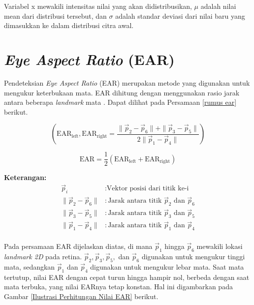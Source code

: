     
    Variabel x mewakili intensitas nilai yang akan didistribusikan, $\mu$ adalah nilai mean dari distribusi tersebut, dan $\sigma$ adalah standar deviasi dari nilai baru yang dimasukkan ke dalam distribusi citra awal.



\section{\textit{Eye Aspect Ratio} (EAR)}

    Pendeteksian \textit{Eye Aspect Ratio }(EAR) merupakan metode yang digunakan untuk mengukur keterbukaan mata. EAR dihitung dengan menggunakan rasio jarak antara beberapa \textit{landmark} mata \cite{electronics11193183}. Dapat dilihat pada Persamaan \ref{rumus ear} berikut.

    
    \begin{equation}
    \label{rumus ear}
    (\text{EAR}_{\text{left}}, \text{EAR}_{\text{right}}   = \frac{{\| \vec{p}_2 - \vec{p}_6 \| + \| \vec{p}_3 - \vec{p}_5 \|}}{{2 \| \vec{p}_1 - \vec{p}_4 \|}})
    \end{equation}

    \begin{equation}
    \text{EAR} = \frac{1}{2}(\text{EAR}_{\text{left}} + \text{EAR}_{\text{right}})
    \end{equation}


    \textbf{Keterangan:}
    \begin{align*}
        \vec{p}_i & : \text{Vektor posisi dari titik ke-i} \\
        \|\vec{p}_2 - \vec{p}_6\| & : \text{Jarak antara titik } \vec{p}_2 \text{ dan } \vec{p}_6 \\
        \|\vec{p}_3 - \vec{p}_5\| & : \text{Jarak antara titik } \vec{p}_3 \text{ dan } \vec{p}_5 \\
        \|\vec{p}_1 - \vec{p}_4\| & : \text{Jarak antara titik } \vec{p}_1 \text{ dan } \vec{p}_4 \\
    \end{align*}
    

    Pada persamaan EAR dijelaskan diatas, di mana $\vec{p}_1$ hingga $\vec{p}_6$ mewakili lokasi
     \textit{landmark 2D} pada retina. $\vec{p}_2, \vec{p}_3, \vec{p}_5,$ dan $\vec{p}_6$ digunakan 
     untuk mengukur tinggi mata, sedangkan $\vec{p}_1$ dan $\vec{p}_4$ digunakan untuk mengukur lebar mata. 
     Saat mata tertutup, nilai EAR dengan cepat turun hingga hampir nol, berbeda dengan saat mata terbuka, 
     yang nilai EARnya tetap konstan. Hal ini digambarkan pada Gambar \ref{Ilustrasi Perhitungan Nilai EAR} berikut.

